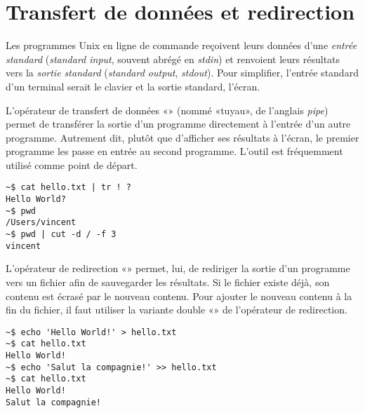 

\section{Transfert de données et redirection}
\label{sec:cli:flux}

Les programmes Unix en ligne de commande reçoivent leurs données d'une
\emph{entrée standard} (\emph{standard
  input}, souvent abrégé en \emph{stdin}) et renvoient leurs résultats
vers la \emph{sortie standard} (\emph{standard output},
\emph{stdout}). Pour simplifier, l'entrée standard d'un terminal
serait le clavier et la sortie standard, l'écran.

L'opérateur de transfert de données %
 «\code{\textbar}»
(nommé «tuyau», de l'anglais \emph{pipe}) permet de
transférer la sortie d'un programme directement à l'entrée d'un autre
programme. Autrement dit, plutôt que d'afficher ses résultats à
l'écran, le premier programme les passe en entrée au second programme.
L'outil  est fréquemment utilisé comme point de départ.
\begin{Schunk}
\begin{Verbatim}
~$ cat hello.txt | tr ! ?
Hello World?
~$ pwd
/Users/vincent
~$ pwd | cut -d / -f 3
vincent
\end{Verbatim}
\end{Schunk} %


L'opérateur de redirection %
«\code{>}» permet, lui, de
rediriger la sortie d'un programme vers un fichier afin de sauvegarder
les résultats. Si le fichier existe déjà, son contenu est écrasé par
le nouveau contenu. Pour ajouter le nouveau contenu à la fin du
fichier, il faut utiliser la variante double %
«\code{>>}» de l'opérateur de
redirection.
\begin{Schunk}
\begin{Verbatim}
~$ echo 'Hello World!' > hello.txt
~$ cat hello.txt
Hello World!
~$ echo 'Salut la compagnie!' >> hello.txt
~$ cat hello.txt
Hello World!
Salut la compagnie!
\end{Verbatim}
\end{Schunk}


